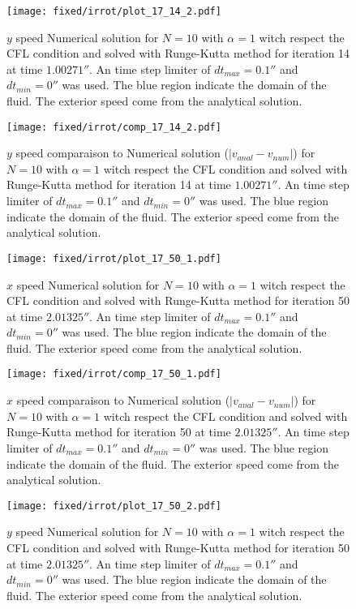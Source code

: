 \begin{figure}
\texttt{[image: fixed/irrot/plot\_17\_14\_2.pdf]}
\caption{$y$ speed Numerical solution for $N=10$ with $\alpha=1$ witch respect the CFL condition and solved with Runge-Kutta method
for iteration 14 at time $\unit{1.00271}{\second}$.
An time step limiter of $dt_{max}=\unit{0.1}{\second}$ and $dt_{min}=\unit{0}{\second}$ was used.
The blue region indicate the domain of the fluid. The exterior speed come from the analytical solution.
\label{fix:plot_17_14_2}
}
\end{figure}

\begin{figure}
\texttt{[image: fixed/irrot/comp\_17\_14\_2.pdf]}
\caption{$y$ speed comparaison to Numerical solution ($|v_{anal}-v_{num}|$) for $N=10$ with $\alpha=1$ witch respect the CFL condition and solved with Runge-Kutta method
for iteration 14 at time $\unit{1.00271}{\second}$.
An time step limiter of $dt_{max}=\unit{0.1}{\second}$ and $dt_{min}=\unit{0}{\second}$ was used.
The blue region indicate the domain of the fluid. The exterior speed come from the analytical solution.
\label{fix:comp_17_14_2}
}
\end{figure}

\begin{figure}
\texttt{[image: fixed/irrot/plot\_17\_50\_1.pdf]}
\caption{$x$ speed Numerical solution for $N=10$ with $\alpha=1$ witch respect the CFL condition and solved with Runge-Kutta method
for iteration 50 at time $\unit{2.01325}{\second}$.
An time step limiter of $dt_{max}=\unit{0.1}{\second}$ and $dt_{min}=\unit{0}{\second}$ was used.
The blue region indicate the domain of the fluid. The exterior speed come from the analytical solution.
\label{fix:plot_17_50_1}
}
\end{figure}

\begin{figure}
\texttt{[image: fixed/irrot/comp\_17\_50\_1.pdf]}
\caption{$x$ speed comparaison to Numerical solution ($|v_{anal}-v_{num}|$) for $N=10$ with $\alpha=1$ witch respect the CFL condition and solved with Runge-Kutta method
for iteration 50 at time $\unit{2.01325}{\second}$.
An time step limiter of $dt_{max}=\unit{0.1}{\second}$ and $dt_{min}=\unit{0}{\second}$ was used.
The blue region indicate the domain of the fluid. The exterior speed come from the analytical solution.
\label{fix:comp_17_50_1}
}
\end{figure}

\begin{figure}
\texttt{[image: fixed/irrot/plot\_17\_50\_2.pdf]}
\caption{$y$ speed Numerical solution for $N=10$ with $\alpha=1$ witch respect the CFL condition and solved with Runge-Kutta method
for iteration 50 at time $\unit{2.01325}{\second}$.
An time step limiter of $dt_{max}=\unit{0.1}{\second}$ and $dt_{min}=\unit{0}{\second}$ was used.
The blue region indicate the domain of the fluid. The exterior speed come from the analytical solution.
\label{fix:plot_17_50_2}
}
\end{figure}

